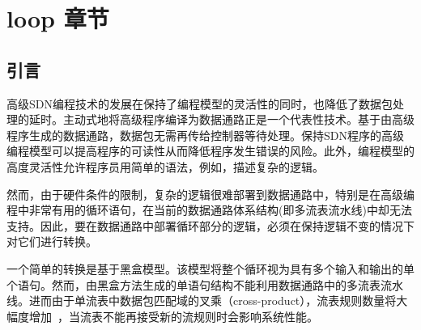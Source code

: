 \chapter{loop 章节} 
%
%




\section{引言} 
\label{sec:intro}

高级SDN编程技术的发展在保持了编程模型的灵活性的同时，也降低了数据包处理的延时。主动式地将高级程序编译为数据通路正是一个代表性技术。基于由高级程序生成的数据通路，数据包无需再传给控制器等待处理。保持SDN程序的高级编程模型可以提高程序的可读性从而降低程序发生错误的风险。此外，编程模型的高度灵活性允许程序员用简单的语法，例如，描述复杂的逻辑。

然而，由于硬件条件的限制，复杂的逻辑很难部署到数据通路中，特别是在高级编程中非常有用的循环语句，在当前的数据通路体系结构(即多流表流水线)中却无法支持。因此，要在数据通路中部署循环部分的逻辑，必须在保持逻辑不变的情况下对它们进行转换。

一个简单的转换是基于黑盒模型。该模型将整个循环视为具有多个输入和输出的单个语句。然而，由黑盒方法生成的单语句结构不能利用数据通路中的多流表流水线。进而由于单流表中数据包匹配域的叉乘（cross-product），流表规则数量将大幅度增加~\cite{openflow1-3-1}，当流表不能再接受新的流规则时会影响系统性能。

